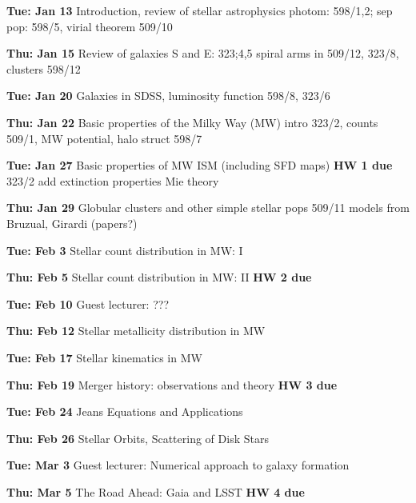   \item {\bf Tue: Jan 13}  Introduction, review of stellar astrophysics
     photom: 598/1,2; sep pop: 598/5, virial theorem 509/10
  \item {\bf Thu: Jan 15}  Review of galaxies
     S and E: 323;4,5 spiral arms in 509/12, 323/8, clusters 598/12
  \item {\bf Tue: Jan 20}  Galaxies in SDSS, luminosity function
     598/8, 323/6 
  \item {\bf Thu: Jan 22}  Basic properties of the Milky Way (MW)
    intro 323/2, counts 509/1, MW potential, halo struct 598/7
  \item {\bf Tue: Jan 27}  Basic properties of MW ISM (including SFD maps) {\bf HW 1 due}
     323/2  add extinction properties Mie theory 
  \item {\bf Thu: Jan 29}  Globular clusters and other simple stellar pops
      509/11 models from Bruzual, Girardi (papers?) 


  \item {\bf Tue: Feb  3}  Stellar count distribution in MW: I 
  \item {\bf Thu: Feb  5}  Stellar count distribution in MW: II {\bf HW 2 due}
  \item {\bf Tue: Feb 10}  Guest lecturer: ???
  \item {\bf Thu: Feb 12}  Stellar metallicity distribution in MW
  \item {\bf Tue: Feb 17}  Stellar kinematics in MW
  \item {\bf Thu: Feb 19}  Merger history: observations and theory {\bf HW 3 due}
  \item {\bf Tue: Feb 24}  Jeans Equations and Applications
  \item {\bf Thu: Feb 26}  Stellar Orbits, Scattering of Disk Stars
  \item {\bf Tue: Mar  3}  Guest lecturer: Numerical approach to galaxy formation
  \item {\bf Thu: Mar  5}  The Road Ahead: Gaia and LSST {\bf HW 4 due}

















